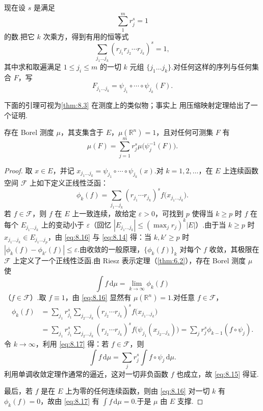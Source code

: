 现在设 $s$ 是满足
\[
  \sum_{1}^{m}r_j^{s}=1
\]
的数.把它 $k$ 次乘方，得到有用的恒等式
\begin{equation}\label{eq:8.14}
  \sum_{j_1\ldots j_k}(r_{j_1}r_{j_2}\cdots r_{j_k})^{s}=1,
\end{equation}
其中求和取遍满足 $1\leq j_i\leq m$ 的一切 $k$ 元组 $\{j_1\ldots j_k\}$.对任何这样的序列与任何集合 $F$，写
\[
  F_{j_1\ldots j_k}=\psi_{j_1}\circ\cdots\circ\psi_{j_k}(F).
\]

下面的引理可视为\cref{thm:8.3} 在测度上的类似物；事实上 \textcite{hutchinson1981} 用压缩映射定理给出了一个证明.

\begin{lemma}\label{lem:8.4}
存在 Borel 测度 $\mu$，其支集含于 $E$，$\mu(\mathbb{R}^n)=1$，且对任何可测集 $F$ 有
\begin{equation}\label{eq:8.15}
  \mu(F)=\sum_{j=1}^{m}r_j^{s}\mu\bigl(\psi_j^{-1}(F)\bigr).
\end{equation}
\end{lemma}

\begin{proof}
取 $x\in E$，并记 $x_{j_1\ldots j_k}=\psi_{j_1}\circ\cdots\circ\psi_{j_k}(x)$.对 $k=1,2,\ldots$，在 $E$ 上连续函数空间 $\mathscr{F}$ 上如下定义正线性泛函：
\begin{equation}\label{eq:8.16}
  \phi_k(f)=\sum_{j_1\ldots j_k}(r_{j_1}\cdots r_{j_k})^{s}f\bigl(x_{j_1\ldots j_k}\bigr).
\end{equation}
若 $f\in\mathscr{F}$，则 $f$ 在 $E$ 上一致连续，故给定 $\varepsilon>0$，可找到 $p$ 使得当 $k\geq p$ 时 $f$ 在每个 $E_{j_1\ldots j_k}$ 上的变动小于 $\varepsilon$（回忆 $|E_{j_1\ldots j_k}|\leq(\max_j r_j)^k|E|$）.由于当 $k\geq p$ 时 $x_{j_1\ldots j_k}\in E_{j_1\ldots j_p}$，由 \eqref{eq:8.16} 与 \eqref{eq:8.14} 得：当 $k,k'\geq p$ 时 $|\phi_k(f)-\phi_{k'}(f)|\leq\varepsilon$.由收敛的一般原理，$\{\phi_k(f)\}_k$ 对每个 $f$ 收敛，其极限在 $\mathscr{F}$ 上定义了一个正线性泛函.由 Riesz 表示定理（\cref{thm:6.2}），存在 Borel 测度 $\mu$ 使
\begin{equation}\label{eq:8.17}
  \int f\,\mathrm{d}\mu=\lim_{k\to\infty}\phi_k(f)
\end{equation}
（$f\in\mathscr{F}$）.取 $f\equiv 1$，由 \eqref{eq:8.16} 显然有 $\mu(\mathbb{R}^n)=1$.对任意 $f\in\mathscr{F}$，
\begin{align*}
  \phi_k(f)
  &=\sum_{j_1}r_{j_1}^{s}\sum_{j_2\ldots j_k}(r_{j_2}\cdots r_{j_k})^{s}f\bigl(x_{j_1\ldots j_k}\bigr)\\
  &=\sum_{j_1}r_{j_1}^{s}\sum_{j_2\ldots j_k}(r_{j_2}\cdots r_{j_k})^{s}f\bigl(\psi_{j_1}(x_{j_2\ldots j_k})\bigr)
  =\sum_{j}r_j^{s}\phi_{k-1}(f\circ\psi_j).
\end{align*}
令 $k\to\infty$，利用 \eqref{eq:8.17} 得：若 $f\in\mathscr{F}$，则
\[
  \int f\,\mathrm{d}\mu=\sum_{j}r_j^{s}\int f\circ\psi_j\,\mathrm{d}\mu.
\]
利用单调收敛定理作通常的逼近，这对一切非负函数 $f$ 也成立，故 \eqref{eq:8.15} 得证.

最后，若 $f$ 是在 $E$ 上为零的任何连续函数，则由 \eqref{eq:8.16} 对一切 $k$ 有 $\phi_k(f)=0$，故由 \eqref{eq:8.17} 有 $\int f\,\mathrm{d}\mu=0$.于是 $\mu$ 由 $E$ 支撑.
\end{proof}

